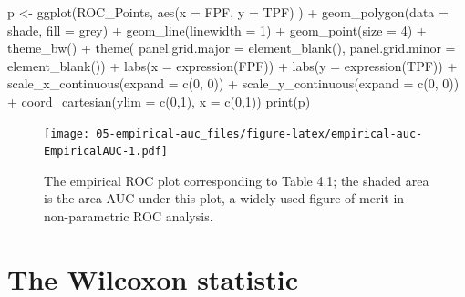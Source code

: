 \documentclass[
]{book}
\newenvironment{Shaded}{\begin{snugshade}}{\end{snugshade}}
\newcommand{\AttributeTok}[1]{\textcolor[rgb]{0.77,0.63,0.00}{#1}}
\newcommand{\DecValTok}[1]{\textcolor[rgb]{0.00,0.00,0.81}{#1}}
\newcommand{\FunctionTok}[1]{\textcolor[rgb]{0.00,0.00,0.00}{#1}}
\newcommand{\NormalTok}[1]{#1}
\newcommand{\OtherTok}[1]{\textcolor[rgb]{0.56,0.35,0.01}{#1}}
\newcommand{\SpecialCharTok}[1]{\textcolor[rgb]{0.00,0.00,0.00}{#1}}
\newcommand{\StringTok}[1]{\textcolor[rgb]{0.31,0.60,0.02}{#1}}
\begin{document}
\begin{Shaded}
\begin{Highlighting}[]
\NormalTok{p }\OtherTok{\textless{}{-}} \FunctionTok{ggplot}\NormalTok{(ROC\_Points, }
            \FunctionTok{aes}\NormalTok{(}\AttributeTok{x =}\NormalTok{ FPF, }\AttributeTok{y =}\NormalTok{ TPF) ) }\SpecialCharTok{+} 
  \FunctionTok{geom\_polygon}\NormalTok{(}\AttributeTok{data =}\NormalTok{ shade, }\AttributeTok{fill =} \StringTok{\textquotesingle{}grey\textquotesingle{}}\NormalTok{) }\SpecialCharTok{+} 
  \FunctionTok{geom\_line}\NormalTok{(}\AttributeTok{linewidth =} \DecValTok{1}\NormalTok{) }\SpecialCharTok{+} 
  \FunctionTok{geom\_point}\NormalTok{(}\AttributeTok{size =} \DecValTok{4}\NormalTok{) }\SpecialCharTok{+} 
  \FunctionTok{theme\_bw}\NormalTok{() }\SpecialCharTok{+} 
  \FunctionTok{theme}\NormalTok{(}
    \AttributeTok{panel.grid.major =} \FunctionTok{element\_blank}\NormalTok{(), }
    \AttributeTok{panel.grid.minor =} \FunctionTok{element\_blank}\NormalTok{()) }\SpecialCharTok{+}
  \FunctionTok{labs}\NormalTok{(}\AttributeTok{x =} \FunctionTok{expression}\NormalTok{(FPF)) }\SpecialCharTok{+} 
  \FunctionTok{labs}\NormalTok{(}\AttributeTok{y =} \FunctionTok{expression}\NormalTok{(TPF)) }\SpecialCharTok{+} 
  \FunctionTok{scale\_x\_continuous}\NormalTok{(}\AttributeTok{expand =} \FunctionTok{c}\NormalTok{(}\DecValTok{0}\NormalTok{, }\DecValTok{0}\NormalTok{)) }\SpecialCharTok{+} 
  \FunctionTok{scale\_y\_continuous}\NormalTok{(}\AttributeTok{expand =} \FunctionTok{c}\NormalTok{(}\DecValTok{0}\NormalTok{, }\DecValTok{0}\NormalTok{)) }\SpecialCharTok{+} 
  \FunctionTok{coord\_cartesian}\NormalTok{(}\AttributeTok{ylim =} \FunctionTok{c}\NormalTok{(}\DecValTok{0}\NormalTok{,}\DecValTok{1}\NormalTok{), }\AttributeTok{x =} \FunctionTok{c}\NormalTok{(}\DecValTok{0}\NormalTok{,}\DecValTok{1}\NormalTok{))}
\FunctionTok{print}\NormalTok{(p)}
\end{Highlighting}
\end{Shaded}

\begin{figure}
\centering
\texttt{[image: 05-empirical-auc\_files/figure-latex/empirical-auc-EmpiricalAUC-1.pdf]}
\caption{\label{fig:empirical-auc-EmpiricalAUC}The empirical ROC plot corresponding to Table 4.1; the shaded area is the area AUC under this plot, a widely used figure of merit in non-parametric ROC analysis.}
\end{figure}

\hypertarget{empirical-auc-wilcoxon}{%
\section{The Wilcoxon statistic}\label{empirical-auc-wilcoxon}}
\end{document}
